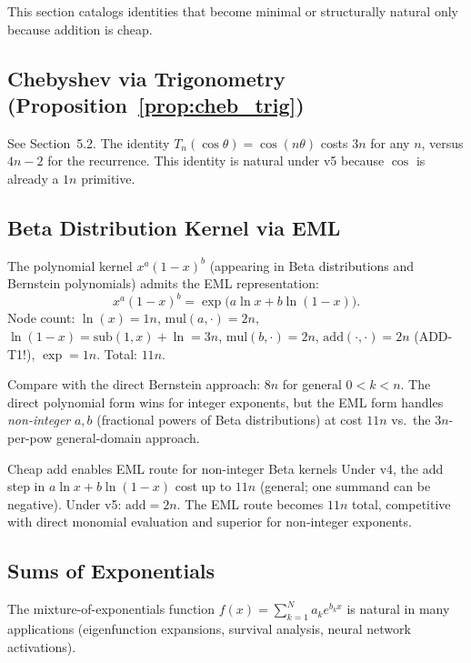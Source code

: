 \documentclass[11pt,a4paper]{article}
\begin{document}
This section catalogs identities that become minimal or structurally natural only because
addition is cheap.

\subsection{Chebyshev via Trigonometry (Proposition~\ref{prop:cheb_trig})}

See Section~5.2. The identity $T_n(\cos\theta) = \cos(n\theta)$ costs $3n$ for any $n$,
versus $4n-2$ for the recurrence. This identity is natural under v5 because $\cos$ is
already a $1n$ primitive.

\subsection{Beta Distribution Kernel via EML}

The polynomial kernel $x^a (1-x)^b$ (appearing in Beta distributions and Bernstein polynomials)
admits the EML representation:
\[
  x^a (1-x)^b = \exp\!\bigl(a \ln x + b \ln(1-x)\bigr).
\]
Node count: $\ln(x) = 1n$, $\mathrm{mul}(a, \cdot) = 2n$, $\ln(1-x) = \mathrm{sub}(1,x) + \ln = 3n$,
$\mathrm{mul}(b, \cdot) = 2n$, $\mathrm{add}(\cdot, \cdot) = 2n$ (ADD-T1!), $\exp = 1n$.
Total: $11n$.

Compare with the direct Bernstein approach: $8n$ for general $0 < k < n$. The direct
polynomial form wins for integer exponents, but the EML form handles \emph{non-integer}
$a, b$ (fractional powers of Beta distributions) at cost $11n$ vs.\ the $3n$-per-pow
general-domain approach.

\begin{findingbox}{Cheap add enables EML route for non-integer Beta kernels}
  Under v4, the add step in $a\ln x + b\ln(1-x)$ cost up to $11n$ (general; one summand
  can be negative). Under v5: $\mathrm{add} = 2n$. The EML route becomes $11n$ total,
  competitive with direct monomial evaluation and superior for non-integer exponents.
\end{findingbox}

\subsection{Sums of Exponentials}

The mixture-of-exponentials function $f(x) = \sum_{k=1}^N a_k e^{b_k x}$ is natural in
many applications (eigenfunction expansions, survival analysis, neural network activations).
\end{document}
